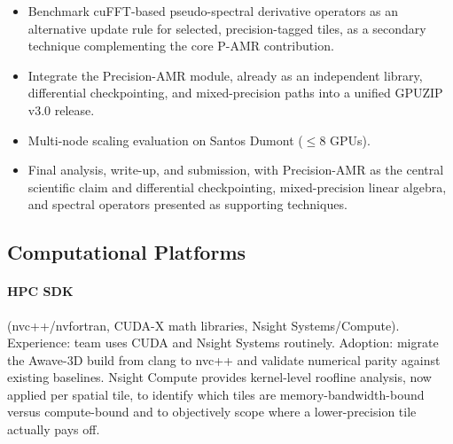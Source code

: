 \documentclass[12pt,a4paper]{article}
\newcommand{\pamr}{P\nobreakdash-AMR}
\begin{document}
\begin{itemize}
  \item Benchmark cuFFT-based pseudo-spectral derivative operators as an
        alternative update rule for selected, precision-tagged tiles, as
        a secondary technique complementing the core \pamr{} contribution.
  \item Integrate the Precision-AMR module, already as an independent
        library, differential checkpointing, and mixed-precision paths
        into a unified GPUZIP v3.0 release.
  \item Multi-node scaling evaluation on Santos Dumont ($\leq$8 GPUs).
  \item Final analysis, write-up, and submission, with Precision-AMR as
        the central scientific claim and differential checkpointing,
        mixed-precision linear algebra, and spectral operators presented
        as supporting techniques.
\end{itemize}

\subsection{Computational Platforms}

\paragraph{HPC SDK} (nvc++/nvfortran, CUDA-X math libraries, Nsight
Systems/Compute). Experience: team uses CUDA and Nsight Systems routinely.
Adoption: migrate the Awave-3D build from clang to nvc++ and validate
numerical parity against existing baselines. Nsight Compute provides
kernel-level roofline analysis, now applied per spatial tile, to identify
which tiles are memory-bandwidth-bound versus compute-bound and to
objectively scope where a lower-precision tile actually pays off.
\end{document}
